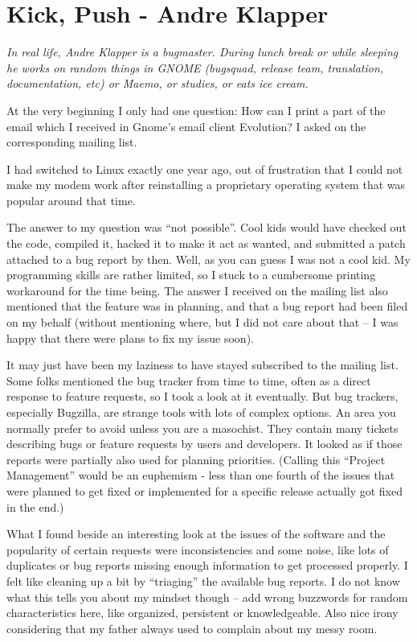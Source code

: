 \chapter{Kick, Push - Andre Klapper}

\textit{In real life, Andre Klapper is a bugmaster. During lunch break or
while sleeping he works on random things in GNOME (bugsquad, release team,
translation, documentation, etc) or Maemo, or studies, or eats ice cream.}

At the very beginning I only had one question: How can I print a part of the
email which I received in Gnome's email client Evolution? I asked on the
corresponding mailing list.

I had switched to Linux exactly one year ago, out of frustration that I
could not make my modem work after reinstalling a proprietary operating system
that was popular around that time.

The answer to my question was ``not possible''. Cool kids would have checked out
the code, compiled it, hacked it to make it act as wanted, and submitted a patch
attached to a bug report by then. Well, as you can guess I was not a cool kid.
My programming skills are rather limited, so I stuck to a cumbersome printing
workaround for the time being. The answer I received on the mailing list also
mentioned that the feature was in planning, and that a bug report had been filed
on my behalf (without mentioning where, but I did not care about that -- I was
happy that there were plans to fix my issue soon).

It may just have been my laziness to have stayed subscribed to the mailing list.
Some folks mentioned the bug tracker from time to time, often as a direct
response to feature requests, so I took a look at it eventually. But bug
trackers, especially Bugzilla, are strange tools with lots of complex options.
An area you normally prefer to avoid unless you are a masochist. They contain
many tickets describing bugs or feature requests by users and developers. It
looked as if those reports were partially also used for planning priorities.
(Calling this ``Project Management'' would be an euphemism - less than one
fourth of the issues that were planned to get fixed or implemented for a
specific release actually got fixed in the end.)

What I found beside an interesting look at the issues of the software and the
popularity of certain requests were inconsistencies and some noise, like lots of
duplicates or bug reports missing enough information to get processed properly.
I felt like cleaning up a bit by ``triaging'' the available bug reports. I do
not know what this tells you about my mindset though -- add wrong buzzwords for
random characteristics here, like organized, persistent or knowledgeable. Also
nice irony considering that my father always used to complain about my messy
room.

